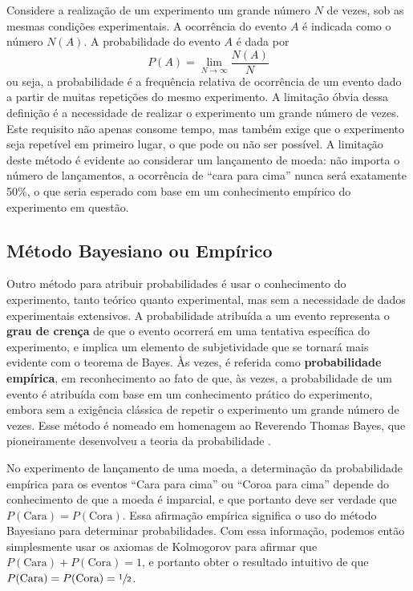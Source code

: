 Considere a realização de um experimento um grande número $N$ de vezes, sob as mesmas condições experimentais. A ocorrência do evento $A$ é indicada como o número $N(A)$. A probabilidade do evento $A$ é dada por
\begin{equation}
P(A) = \lim_{N \to \infty} \dfrac{N(A)}{N}
\end{equation}
ou seja, a probabilidade é a frequência relativa de ocorrência de um evento dado a partir de muitas repetições do mesmo experimento. A limitação óbvia dessa definição é a necessidade de realizar o experimento um grande número de vezes. Este requisito não apenas consome tempo, mas também exige que o experimento seja repetível em primeiro lugar, o que pode ou não ser possível. A limitação deste método é evidente ao considerar um lançamento de moeda: não importa o número de lançamentos, a ocorrência de ``cara para cima'' nunca será exatamente 50\%, o que seria esperado com base em um conhecimento empírico do experimento em questão.

\subsection{Método Bayesiano ou Empírico}

Outro método para atribuir probabilidades é usar o conhecimento do experimento, tanto teórico quanto experimental, mas sem a necessidade de dados experimentais extensivos. A probabilidade atribuída a um evento representa o \textbf{grau de crença} de que o evento ocorrerá em uma tentativa específica do experimento, e implica um elemento de subjetividade que se tornará mais evidente com o teorema de Bayes. Às vezes, é referida como \textbf{probabilidade empírica}, em reconhecimento ao fato de que, às vezes, a probabilidade de um evento é atribuída com base em um conhecimento prático do experimento, embora sem a exigência clássica de repetir o experimento um grande número de vezes. Esse método é nomeado em homenagem ao Reverendo Thomas Bayes, que pioneiramente desenvolveu a teoria da probabilidade \citep{bayes1763lii}.

\begin{exemplo}{}{}
No experimento de lançamento de uma moeda, a determinação da probabilidade empírica para os eventos ``Cara para cima'' ou ``Coroa para cima'' depende do conhecimento de que a moeda é imparcial, e que portanto deve ser verdade que $P(\text{Cara}) = P(\text{Cora})$. Essa afirmação empírica significa o uso do método Bayesiano para determinar probabilidades. Com essa informação, podemos então simplesmente usar os axiomas de Kolmogorov para afirmar que $P(\text{Cara}) + P(\text{Cora}) = 1$, e portanto obter o resultado intuitivo de que $P(\text{Cara}) = P(\text{Cora}) = \sfrac{1}{2}$.
\end{exemplo}

